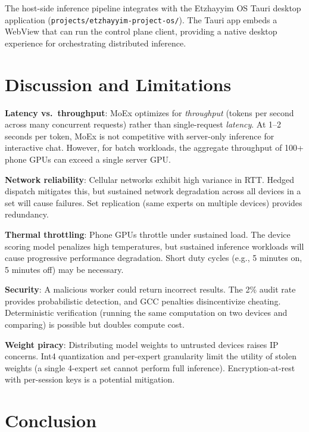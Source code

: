 \documentclass[11pt,a4paper]{article}
\begin{document}
The host-side inference pipeline integrates with the Etzhayyim OS Tauri
desktop application (\texttt{projects/etzhayyim-project-os/}). The
Tauri app embeds a WebView that can run the control plane client,
providing a native desktop experience for orchestrating distributed
inference.

\section{Discussion and Limitations}
\label{sec:discussion}

\textbf{Latency vs.\ throughput}: MoEx optimizes for \emph{throughput}
(tokens per second across many concurrent requests) rather than
single-request \emph{latency}. At 1--2 seconds per token, MoEx is
not competitive with server-only inference for interactive chat.
However, for batch workloads, the aggregate throughput of 100+ phone
GPUs can exceed a single server GPU.

\textbf{Network reliability}: Cellular networks exhibit high variance
in RTT. Hedged dispatch mitigates this, but sustained network
degradation across all devices in a set will cause failures. Set
replication (same experts on multiple devices) provides redundancy.

\textbf{Thermal throttling}: Phone GPUs throttle under sustained load.
The device scoring model penalizes high temperatures, but sustained
inference workloads will cause progressive performance degradation.
Short duty cycles (e.g., 5 minutes on, 5 minutes off) may be
necessary.

\textbf{Security}: A malicious worker could return incorrect results.
The 2\% audit rate provides probabilistic detection, and GCC penalties
disincentivize cheating. Deterministic verification (running the same
computation on two devices and comparing) is possible but doubles
compute cost.

\textbf{Weight piracy}: Distributing model weights to untrusted devices
raises IP concerns. Int4 quantization and per-expert granularity
limit the utility of stolen weights (a single 4-expert set cannot
perform full inference). Encryption-at-rest with per-session keys
is a potential mitigation.

\section{Conclusion}
\label{sec:conclusion}
\end{document}
